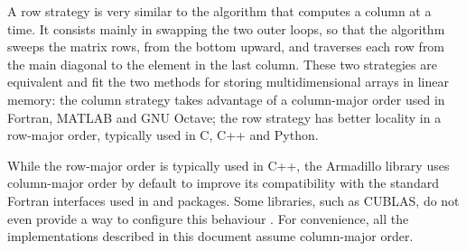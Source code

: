 \documentclass[../thesis]{subfiles}
\begin{document}
	A row strategy is very similar to the algorithm that computes a column at a time. It consists mainly in swapping the two outer loops, so that the algorithm sweeps the matrix rows, from the bottom upward, and traverses each row from the main diagonal to the element in the last column. These two strategies are equivalent and fit the two methods for storing multidimensional arrays in linear memory: the column strategy takes advantage of a column-major order used in Fortran, MATLAB and GNU Octave; the row strategy has better locality in a row-major order, typically used in C, C++ and Python.

	While the row-major order is typically used in C++, the Armadillo library uses column-major order by default to improve its compatibility with the standard Fortran interfaces used in \blas and \lapack packages. Some libraries, such as CUBLAS, do not even provide a way to configure this behaviour \cite{NVIDIA:CUBLAS:5:0}. For convenience, all the implementations described in this document assume column-major order.
\end{document}
